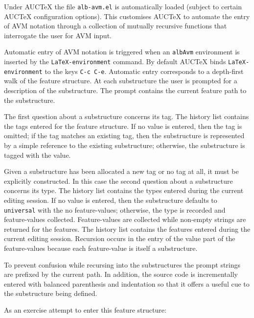 \documentclass[a4paper,11pt]{article}
\newcommand{\AUCTeX}[0]{AUC\TeX{}}
\begin{document}
Under \AUCTeX{} the file \texttt{alb-avm.el} is automatically loaded
(subject to certain \AUCTeX{} configuration options).  This customises
\AUCTeX{} to automate the entry of AVM notation through a collection of
mutually recursive functions that interrogate the user for AVM input.

Automatic entry of AVM notation is triggered when an \texttt{albAvm}
environment is inserted by the \texttt{LaTeX-environment} command.  By
default \AUCTeX{} binds \texttt{LaTeX-environment} to the keys \texttt{C-c
  C-e}.  Automatic entry corresponds to a depth-first walk of the
feature structure.  At each substructure the user is prompted for
a description of the substructure.  The prompt contains the current
feature path to the substructure.

The first question about a substructure concerns its tag.  The history
list contains the tags entered for the feature structure.  If no value
is entered, then the tag is omitted; if the tag matches an existing tag,
then the substructure is represented by a simple reference to the
existing substructure; otherwise, the substructure is tagged with the
value.

Given a substructure has been allocated a new tag or no tag at all, it
must be explicitly constructed.  In this case the second question about
a substructure concerns its type.  The history list contains the types
entered during the current editing session.  If no value is entered,
then the substructure defaults to \texttt{universal} with the no
feature-values; otherwise, the type is recorded and feature-values
collected.  Feature-values are collected while non-empty strings are
returned for the features.  The history list contains the features
entered during the current editing session.  Recursion occurs in the
entry of the value part of the feature-values because each feature-value
is itself a substructure.

To prevent confusion while recursing into the substructures the prompt
strings are prefixed by the current path.  In addition, the source code
is incrementally entered with balanced parenthesis and indentation so
that it offers a useful cue to the substructure being defined.

As an exercise attempt to enter this feature structure:

\begin{quote}
  \begin{albAvm}
  \end{albAvm}
\end{quote}
\end{document}
